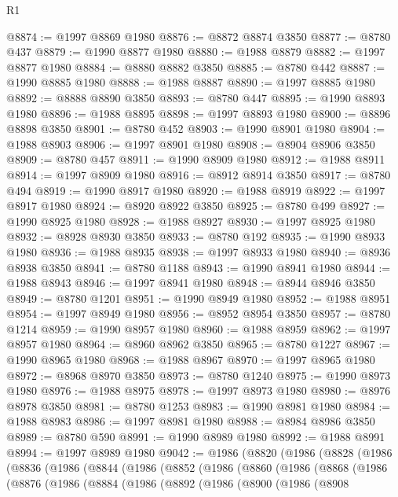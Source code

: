 \begin{lexlean}{R1}
\begin{coremodule}
@8874 := @1997 @8869 @1980
@8876 := @8872 @8874 @3850
@8877 := @8780 @437
@8879 := @1990 @8877 @1980
@8880 := @1988 @8879
@8882 := @1997 @8877 @1980
@8884 := @8880 @8882 @3850
@8885 := @8780 @442
@8887 := @1990 @8885 @1980
@8888 := @1988 @8887
@8890 := @1997 @8885 @1980
@8892 := @8888 @8890 @3850
@8893 := @8780 @447
@8895 := @1990 @8893 @1980
@8896 := @1988 @8895
@8898 := @1997 @8893 @1980
@8900 := @8896 @8898 @3850
@8901 := @8780 @452
@8903 := @1990 @8901 @1980
@8904 := @1988 @8903
@8906 := @1997 @8901 @1980
@8908 := @8904 @8906 @3850
@8909 := @8780 @457
@8911 := @1990 @8909 @1980
@8912 := @1988 @8911
@8914 := @1997 @8909 @1980
@8916 := @8912 @8914 @3850
@8917 := @8780 @494
@8919 := @1990 @8917 @1980
@8920 := @1988 @8919
@8922 := @1997 @8917 @1980
@8924 := @8920 @8922 @3850
@8925 := @8780 @499
@8927 := @1990 @8925 @1980
@8928 := @1988 @8927
@8930 := @1997 @8925 @1980
@8932 := @8928 @8930 @3850
@8933 := @8780 @192
@8935 := @1990 @8933 @1980
@8936 := @1988 @8935
@8938 := @1997 @8933 @1980
@8940 := @8936 @8938 @3850
@8941 := @8780 @1188
@8943 := @1990 @8941 @1980
@8944 := @1988 @8943
@8946 := @1997 @8941 @1980
@8948 := @8944 @8946 @3850
@8949 := @8780 @1201
@8951 := @1990 @8949 @1980
@8952 := @1988 @8951
@8954 := @1997 @8949 @1980
@8956 := @8952 @8954 @3850
@8957 := @8780 @1214
@8959 := @1990 @8957 @1980
@8960 := @1988 @8959
@8962 := @1997 @8957 @1980
@8964 := @8960 @8962 @3850
@8965 := @8780 @1227
@8967 := @1990 @8965 @1980
@8968 := @1988 @8967
@8970 := @1997 @8965 @1980
@8972 := @8968 @8970 @3850
@8973 := @8780 @1240
@8975 := @1990 @8973 @1980
@8976 := @1988 @8975
@8978 := @1997 @8973 @1980
@8980 := @8976 @8978 @3850
@8981 := @8780 @1253
@8983 := @1990 @8981 @1980
@8984 := @1988 @8983
@8986 := @1997 @8981 @1980
@8988 := @8984 @8986 @3850
@8989 := @8780 @590
@8991 := @1990 @8989 @1980
@8992 := @1988 @8991
@8994 := @1997 @8989 @1980
@9042 := @1986
    (@8820
      (@1986
        (@8828
          (@1986
            (@8836
              (@1986
                (@8844
                  (@1986
                    (@8852
                      (@1986
                        (@8860
                          (@1986
                            (@8868
                              (@1986
                                (@8876
                                  (@1986
                                    (@8884
                                      (@1986
                                        (@8892
                                          (@1986
                                            (@8900
                                              (@1986
                                                (@8908

\end{coremodule}
\end{lexlean}
